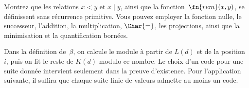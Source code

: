 \documentclass[../../../include/open-logic-section]{subfiles}
\begin{document}
\begin{prob}
  Montrez que les relations $x<y$ et $x\mid y$, ainsi que la
  fonction~$\fn{rem}(x,y)$, se définissent sans récurrence
  primitive. Vous pouvez employer la fonction nulle, le
  successeur, l'addition, la multiplication, $\Char{=}$, les
  projections, ainsi que la minimisation et la quantification
  bornées.
\end{prob}

\begin{explain}
Dans la définition de~$\beta$, on calcule le module à partir
de $L(d)$ et de la position~$i$, puis on lit le reste de
$K(d)$ modulo ce nombre. Le choix d'un code pour une suite
donnée intervient seulement dans la preuve d'existence. Pour
l'application suivante, il suffira que chaque suite finie de
valeurs admette au moins un code.
\end{explain}
\end{document}
